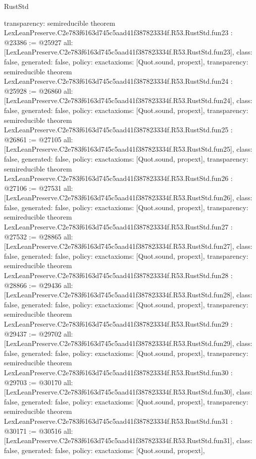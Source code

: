 \begin{lexlean}{RustStd}
\begin{coremodule}
{  transparency: semireducible
}
theorem LexLeanPreserve.C2e783f6163d745c5aad41f387823334f.R53.RustStd.fun23 : @23386 := @25927 {
  all: [LexLeanPreserve.C2e783f6163d745c5aad41f387823334f.R53.RustStd.fun23],
  class: false,
  generated: false,
  policy: exact{axioms: [Quot.sound, propext]},
  transparency: semireducible
}
theorem LexLeanPreserve.C2e783f6163d745c5aad41f387823334f.R53.RustStd.fun24 : @25928 := @26860 {
  all: [LexLeanPreserve.C2e783f6163d745c5aad41f387823334f.R53.RustStd.fun24],
  class: false,
  generated: false,
  policy: exact{axioms: [Quot.sound, propext]},
  transparency: semireducible
}
theorem LexLeanPreserve.C2e783f6163d745c5aad41f387823334f.R53.RustStd.fun25 : @26861 := @27105 {
  all: [LexLeanPreserve.C2e783f6163d745c5aad41f387823334f.R53.RustStd.fun25],
  class: false,
  generated: false,
  policy: exact{axioms: [Quot.sound, propext]},
  transparency: semireducible
}
theorem LexLeanPreserve.C2e783f6163d745c5aad41f387823334f.R53.RustStd.fun26 : @27106 := @27531 {
  all: [LexLeanPreserve.C2e783f6163d745c5aad41f387823334f.R53.RustStd.fun26],
  class: false,
  generated: false,
  policy: exact{axioms: [Quot.sound, propext]},
  transparency: semireducible
}
theorem LexLeanPreserve.C2e783f6163d745c5aad41f387823334f.R53.RustStd.fun27 : @27532 := @28865 {
  all: [LexLeanPreserve.C2e783f6163d745c5aad41f387823334f.R53.RustStd.fun27],
  class: false,
  generated: false,
  policy: exact{axioms: [Quot.sound, propext]},
  transparency: semireducible
}
theorem LexLeanPreserve.C2e783f6163d745c5aad41f387823334f.R53.RustStd.fun28 : @28866 := @29436 {
  all: [LexLeanPreserve.C2e783f6163d745c5aad41f387823334f.R53.RustStd.fun28],
  class: false,
  generated: false,
  policy: exact{axioms: [Quot.sound, propext]},
  transparency: semireducible
}
theorem LexLeanPreserve.C2e783f6163d745c5aad41f387823334f.R53.RustStd.fun29 : @29437 := @29702 {
  all: [LexLeanPreserve.C2e783f6163d745c5aad41f387823334f.R53.RustStd.fun29],
  class: false,
  generated: false,
  policy: exact{axioms: [Quot.sound, propext]},
  transparency: semireducible
}
theorem LexLeanPreserve.C2e783f6163d745c5aad41f387823334f.R53.RustStd.fun30 : @29703 := @30170 {
  all: [LexLeanPreserve.C2e783f6163d745c5aad41f387823334f.R53.RustStd.fun30],
  class: false,
  generated: false,
  policy: exact{axioms: [Quot.sound, propext]},
  transparency: semireducible
}
theorem LexLeanPreserve.C2e783f6163d745c5aad41f387823334f.R53.RustStd.fun31 : @30171 := @30516 {
  all: [LexLeanPreserve.C2e783f6163d745c5aad41f387823334f.R53.RustStd.fun31],
  class: false,
  generated: false,
  policy: exact{axioms: [Quot.sound, propext]},
}
\end{coremodule}
\end{lexlean}
